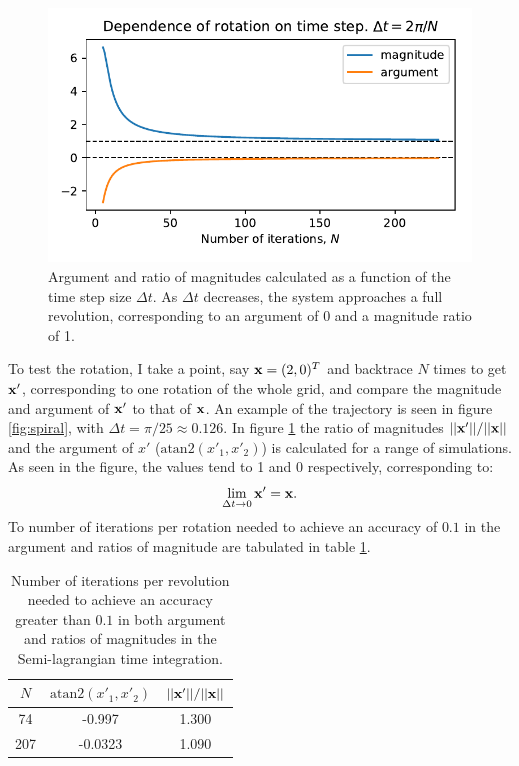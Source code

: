 \documentclass[sigconf]{acmart}
\begin{document}
\begin{figure}
	\centering
	\includegraphics[width=\linewidth]{rotation_dependence.pdf}
	\caption{Argument and ratio of magnitudes calculated as a function of the time step size $  \Delta t $. As $ \Delta t $ decreases, the system approaches a full revolution, corresponding to an argument of 0 and a magnitude ratio of 1.}
	\label{fig:rotation}
\end{figure}

To test the rotation, I take a point, say $ \mathbf{x} = (2,0)^T $ and backtrace $ N $ times to get $ \mathbf{x}' $, corresponding to one rotation of the whole grid, and compare the magnitude and argument of $ \mathbf{x}' $ to that of $ \mathbf{x} $. An example of the trajectory is seen in figure \ref{fig:spiral}, with $ \Delta t = \pi/25\approx 0.126 $. In figure \ref{fig:rotation} the ratio of magnitudes $ ||\mathbf{x}'|| / ||\mathbf{x}|| $ and the argument of $ x' $ ($ \text{atan2}(x'_1, x'_2) $) is calculated for a range of simulations. As seen in the figure, the values tend to 1 and 0 respectively, corresponding to:
\begin{equation}\label{key}
	\lim\limits_{\Delta t \to 0} \mathbf{x}' = \mathbf{x}.
\end{equation}
To number of iterations per rotation needed to achieve an accuracy of $ 0.1 $ in the argument and ratios of magnitude are tabulated in table \ref{tab:arg_mag}.

\begin{table}
	\centering
	\begin{tabular}{ccc}
		\hline
		$ N $ & $ \text{atan2}(x'_1, x'_2) $ & $ ||\mathbf{x}'|| / ||\mathbf{x}|| $ \\
		\hline
		74 & -0.997 & 1.300 \\
		207 & -0.0323 & 1.090 \\
		\hline
	\end{tabular}
	\caption{Number of iterations per revolution needed to achieve an accuracy greater than $ 0.1 $ in both argument and ratios of magnitudes in the Semi-lagrangian time integration.}
	\label{tab:arg_mag}
\end{table} 
\end{document}
